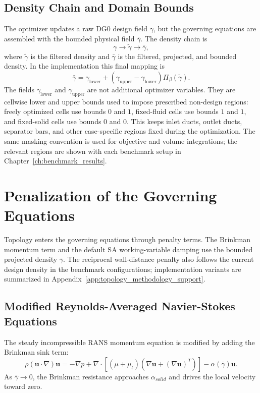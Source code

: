 \subsection{Density Chain and Domain Bounds}
The optimizer updates a raw DG0 design field $\gamma$, but the governing equations are assembled with the bounded physical field $\bar{\gamma}$. The density chain is
\begin{equation}
	\gamma
	\longrightarrow
	\tilde{\gamma}
	\longrightarrow
	\bar{\gamma},
\end{equation}
where $\tilde{\gamma}$ is the filtered density and $\bar{\gamma}$ is the filtered, projected, and bounded density. In the implementation this final mapping is
\begin{equation}
	\bar{\gamma} =
	\gamma_{\mathrm{lower}}
	+
	(\gamma_{\mathrm{upper}}-\gamma_{\mathrm{lower}})
	\Pi_{\beta}(\tilde{\gamma}).
	\label{eq:bounded_projected_density}
\end{equation}
The fields $\gamma_{\mathrm{lower}}$ and $\gamma_{\mathrm{upper}}$ are not additional optimizer variables. They are cellwise lower and upper bounds used to impose prescribed non-design regions: freely optimized cells use bounds $0$ and $1$, fixed-fluid cells use bounds $1$ and $1$, and fixed-solid cells use bounds $0$ and $0$. This keeps inlet ducts, outlet ducts, separator bars, and other case-specific regions fixed during the optimization. The same masking convention is used for objective and volume integrations; the relevant regions are shown with each benchmark setup in Chapter~\ref{ch:benchmark_results}.

\section{Penalization of the Governing Equations}
\label{sec:penalization_governing}
Topology enters the governing equations through penalty terms. The Brinkman momentum term and the default SA working-variable damping use the bounded projected density $\bar{\gamma}$. The reciprocal wall-distance penalty also follows the current design density in the benchmark configurations; implementation variants are summarized in Appendix~\ref{app:topology_methodology_support}.

\subsection{Modified Reynolds-Averaged Navier-Stokes Equations}
The steady incompressible RANS momentum equation is modified by adding the Brinkman sink term:
\begin{equation}
	\rho (\mathbf{u} \cdot \nabla) \mathbf{u}
	= -\nabla p
	+ \nabla \cdot
	\left[
	(\mu+\mu_t)
	\left(\nabla\mathbf{u}+(\nabla\mathbf{u})^T\right)
	\right]
	-\alpha(\bar{\gamma})\mathbf{u}.
	\label{eq:penalized_momentum}
\end{equation}
As $\bar{\gamma}\to0$, the Brinkman resistance approaches $\alpha_{solid}$ and drives the local velocity toward zero.


